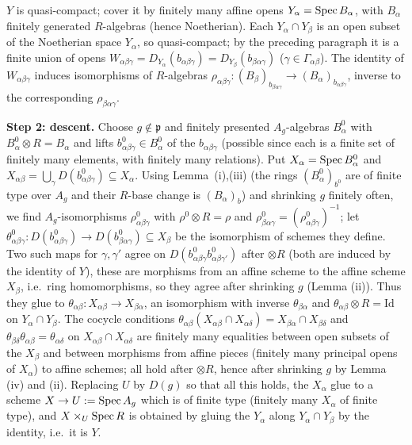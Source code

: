 \documentclass[11pt]{article}
\begin{document}
$Y$ is quasi-compact; cover it by finitely many affine opens $Y_\alpha=\operatorname{Spec} B_\alpha$, with $B_\alpha$ finitely generated $R$-algebras (hence Noetherian). Each $Y_\alpha\cap Y_\beta$ is an open subset of the Noetherian space $Y_\alpha$, so quasi-compact; by the preceding paragraph it is a finite union of opens $W_{\alpha\beta\gamma}=D_{Y_\alpha}(b_{\alpha\beta\gamma})=D_{Y_\beta}(b_{\beta\alpha\gamma})$ ($\gamma\in\Gamma_{\alpha\beta}$). The identity of $W_{\alpha\beta\gamma}$ induces isomorphisms of $R$-algebras $\rho_{\alpha\beta\gamma}:(B_\beta)_{b_{\beta\alpha\gamma}}\to(B_\alpha)_{b_{\alpha\beta\gamma}}$, inverse to the corresponding $\rho_{\beta\alpha\gamma}$.

\textbf{Step 2: descent.} Choose $g\notin\mathfrak p$ and finitely presented $A_g$-algebras $B^0_\alpha$ with $B^0_\alpha\otimes R=B_\alpha$ and lifts $b^0_{\alpha\beta\gamma}\in B^0_\alpha$ of the $b_{\alpha\beta\gamma}$ (possible since each is a finite set of finitely many elements, with finitely many relations). Put $X_\alpha=\operatorname{Spec} B^0_\alpha$ and $X_{\alpha\beta}=\bigcup_\gamma D(b^0_{\alpha\beta\gamma})\subseteq X_\alpha$. Using Lemma~(i),(iii) (the rings $(B^0_\alpha)_{b^0}$ are of finite type over $A_g$ and their $R$-base change is $(B_\alpha)_b$) and shrinking $g$ finitely often, we find $A_g$-isomorphisms $\rho^0_{\alpha\beta\gamma}$ with $\rho^0\otimes R=\rho$ and $\rho^0_{\beta\alpha\gamma}=(\rho^0_{\alpha\beta\gamma})^{-1}$; let $\theta^0_{\alpha\beta\gamma}:D(b^0_{\alpha\beta\gamma})\to D(b^0_{\beta\alpha\gamma})\subseteq X_\beta$ be the isomorphism of schemes they define. Two such maps for $\gamma,\gamma'$ agree on $D(b^0_{\alpha\beta\gamma}b^0_{\alpha\beta\gamma'})$ after $\otimes R$ (both are induced by the identity of $Y$), these are morphisms from an affine scheme to the affine scheme $X_\beta$, i.e.\ ring homomorphisms, so they agree after shrinking $g$ (Lemma (ii)). Thus they glue to $\theta_{\alpha\beta}:X_{\alpha\beta}\to X_{\beta\alpha}$, an isomorphism with inverse $\theta_{\beta\alpha}$ and $\theta_{\alpha\beta}\otimes R=\mathrm{Id}$ on $Y_\alpha\cap Y_\beta$. The cocycle conditions $\theta_{\alpha\beta}(X_{\alpha\beta}\cap X_{\alpha\delta})=X_{\beta\alpha}\cap X_{\beta\delta}$ and $\theta_{\beta\delta}\theta_{\alpha\beta}=\theta_{\alpha\delta}$ on $X_{\alpha\beta}\cap X_{\alpha\delta}$ are finitely many equalities between open subsets of the $X_\beta$ and between morphisms from affine pieces (finitely many principal opens of $X_\alpha$) to affine schemes; all hold after $\otimes R$, hence after shrinking $g$ by Lemma (iv) and (ii). Replacing $U$ by $D(g)$ so that all this holds, the $X_\alpha$ glue to a scheme $X\to U:=\operatorname{Spec} A_g$ which is of finite type (finitely many $X_\alpha$ of finite type), and $X\times_U\operatorname{Spec} R$ is obtained by gluing the $Y_\alpha$ along $Y_\alpha\cap Y_\beta$ by the identity, i.e.\ it is $Y$.
\end{document}
